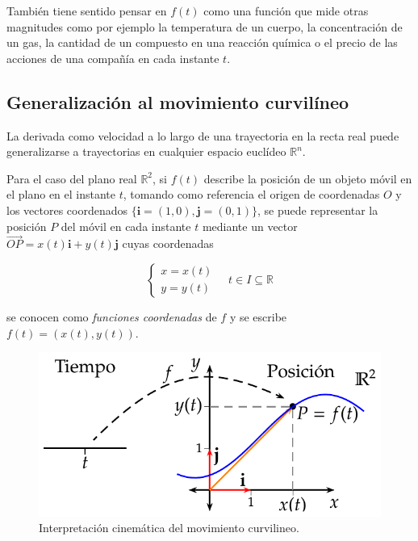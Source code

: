 \documentclass[
  a4paper,
]{scrreport}
\theoremstyle{definition}
\theoremstyle{plain}
\theoremstyle{definition}
\theoremstyle{definition}
\theoremstyle{plain}
\theoremstyle{plain}
\theoremstyle{remark}
\begin{document}
\begin{tcolorbox}[enhanced jigsaw, leftrule=.75mm, colbacktitle=quarto-callout-note-color!10!white, toprule=.15mm, opacityback=0, opacitybacktitle=0.6, toptitle=1mm, breakable, bottomtitle=1mm, colframe=quarto-callout-note-color-frame, rightrule=.15mm, titlerule=0mm, title=\textcolor{quarto-callout-note-color}{\faInfo}\hspace{0.5em}{Nota}, arc=.35mm, left=2mm, bottomrule=.15mm, colback=white, coltitle=black]

También tiene sentido pensar en \(f(t)\) como una función que mide otras
magnitudes como por ejemplo la temperatura de un cuerpo, la
concentración de un gas, la cantidad de un compuesto en una reacción
química o el precio de las acciones de una compañía en cada instante
\(t\).

\end{tcolorbox}

\subsection{Generalización al movimiento
curvilíneo}\label{generalizaciuxf3n-al-movimiento-curviluxedneo}

La derivada como velocidad a lo largo de una trayectoria en la recta
real puede generalizarse a trayectorias en cualquier espacio euclídeo
\(\mathbb{R}^n\).

Para el caso del plano real \(\mathbb{R}^2\), si \(f(t)\) describe la
posición de un objeto móvil en el plano en el instante \(t\), tomando
como referencia el origen de coordenadas \(O\) y los vectores
coordenados \(\{\mathbf{i}=(1,0),\mathbf{j}=(0,1)\}\), se puede
representar la posición \(P\) del móvil en cada instante \(t\) mediante
un vector \(\vec{OP}=x(t)\mathbf{i}+y(t)\mathbf{j}\) cuyas coordenadas

\[
\begin{cases}
x=x(t)\\
y=y(t)
\end{cases}
\quad
t\in I\subseteq \mathbb{R}
\]

se conocen como \emph{funciones coordenadas} de \(f\) y se escribe
\(f(t)=(x(t),y(t))\).

\begin{figure}[H]

{\centering \includegraphics{img/derivadas/movimiento_curvilineo.png}

}

\caption{Interpretación cinemática del movimiento curvilineo.}

\end{figure}%
\end{document}
